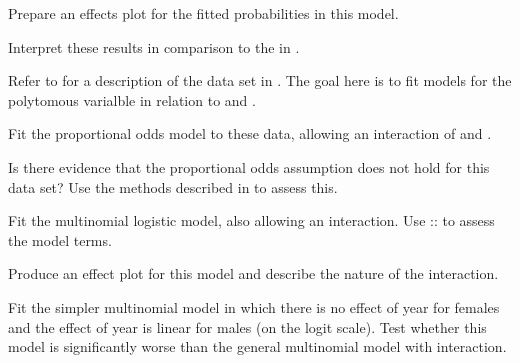 \documentclass[10pt]{report}\usepackage[]{graphicx}\usepackage[]{color}
\begin{document}
\begin{Exercises}
\begin{enumerate*}
    \item Prepare an effects plot for the fitted probabilities in this model.
    \begin{ans}
    \end{ans}
    
    \item Interpret these results in comparison to the \ca  in .
    \begin{ans}
    \end{ans}
    
  \end{enumerate*}

\exercise\exhard\label{lab:logist-vietnam} Refer to  for a description of the  data set
  in . The goal here is to fit models for the polytomous  varialble in relation to 
  and .
  \begin{enumerate*}
    \item  Fit the proportional odds model to these data, allowing an interaction of  and .
    \begin{ans}
    \end{ans}
    
    \item Is there evidence that the proportional odds assumption does not hold for this data set? Use the methods
    described in  to assess this.
    \begin{ans}
    \end{ans}
    
    \item  Fit the multinomial logistic model, also allowing an interaction.  Use ::
    to assess the model terms.
    \begin{ans}
    \end{ans}
    
    \item Produce an effect plot for this model and describe the nature of the interaction.
    \begin{ans}
    \end{ans}
    
    \item Fit the simpler multinomial model in which there is no effect of year for females and the effect of
    year is linear for males (on the logit scale).  Test whether this model is significantly worse than the
    general multinomial model with interaction.
    \begin{ans}
    \end{ans}
    
  \end{enumerate*}
  

\end{Exercises}
\end{document}
